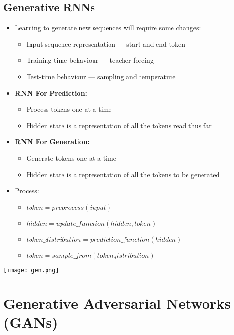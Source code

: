 \documentclass[11pt]{article}
\begin{document}
\subsection{Generative RNNs}
\begin{itemize}
\item Learning to generate new sequences will require some changes:
\begin{itemize}
\item Input sequence representation --- start and end token
\item Training-time behaviour --- teacher-forcing
\item Test-time behaviour --- sampling and temperature
\end{itemize}
\item\textbf{ RNN For Prediction:}
\begin{itemize}
\item Process tokens one at a time
\item Hidden state is a representation of all the tokens read thus far
\end{itemize}
\item \textbf{RNN For Generation:}
\begin{itemize}
\item Generate tokens one at a time
\item Hidden state is a representation of all the tokens to be generated
\end{itemize}
\end{itemize}
\begin{itemize}
\item Process:
\begin{itemize}
\item $token = preprocess (input)$
\item $hidden = update\_function (hidden, token)$
\item $token\_distribution = prediction\_function (hidden)$
\item $token = sample\_from (token_distribution)$
\end{itemize}
\end{itemize}
\begin{center}
\texttt{[image: gen.png]}
\end{center}


\pagebreak

\section{Generative Adversarial Networks (GANs)}
\end{document}
